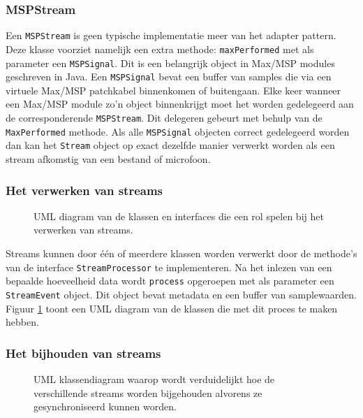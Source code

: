 \subsubsection{MSPStream}

Een \texttt{MSPStream} is geen typische implementatie meer van het adapter pattern. Deze klasse voorziet namelijk een extra methode: \texttt{maxPerformed} met als parameter een \texttt{MSPSignal}. Dit is een belangrijk object in Max/MSP modules geschreven in Java. Een \texttt{MSPSignal} bevat een buffer van samples die via een virtuele Max/MSP patchkabel binnenkomen of buitengaan. Elke keer wanneer een Max/MSP module zo'n object binnenkrijgt moet het worden gedelegeerd aan de corresponderende \texttt{MSPStream}. Dit delegeren gebeurt met behulp van de \texttt{MaxPerformed} methode. Als alle \texttt{MSPSignal} objecten correct gedelegeerd worden dan kan het \texttt{Stream} object op exact dezelfde manier verwerkt worden als een stream afkomstig van een bestand of microfoon.

\subsubsection{Het verwerken van streams}
\label{streamprocessing}

\begin{figure}[h!]
	\captionsetup{width=0.7\textwidth}
	\caption[UML diagram van de stream verwerkingsklassen]{UML diagram van de klassen en interfaces die een rol spelen bij het verwerken van streams.}
	\begin{center}
		\advance\parskip0.3cm
		
	\end{center}
	\label{StreamProcessing}
\end{figure}

Streams kunnen door één of meerdere klassen worden verwerkt door de methode's van de interface \texttt{StreamProcessor} te implementeren. Na het inlezen van een bepaalde hoeveelheid data wordt \texttt{process} opgeroepen met als parameter een \texttt{StreamEvent} object. Dit object bevat metadata en een buffer van samplewaarden. Figuur \ref{StreamProcessing} toont een UML diagram van de klassen die met dit proces te maken hebben.

\subsubsection{Het bijhouden van streams}

\begin{figure}[h!]
	\captionsetup{width=0.7\textwidth}
	\caption[UML diagram dat toont hoe streams worden opgeslagen]{UML klassendiagram waarop wordt verduidelijkt hoe de verschillende streams worden bijgehouden alvorens ze gesynchroniseerd kunnen worden. }
	\begin{center}
		\advance\parskip0.3cm
		
	\end{center}
	\label{streamStorage}
\end{figure}

